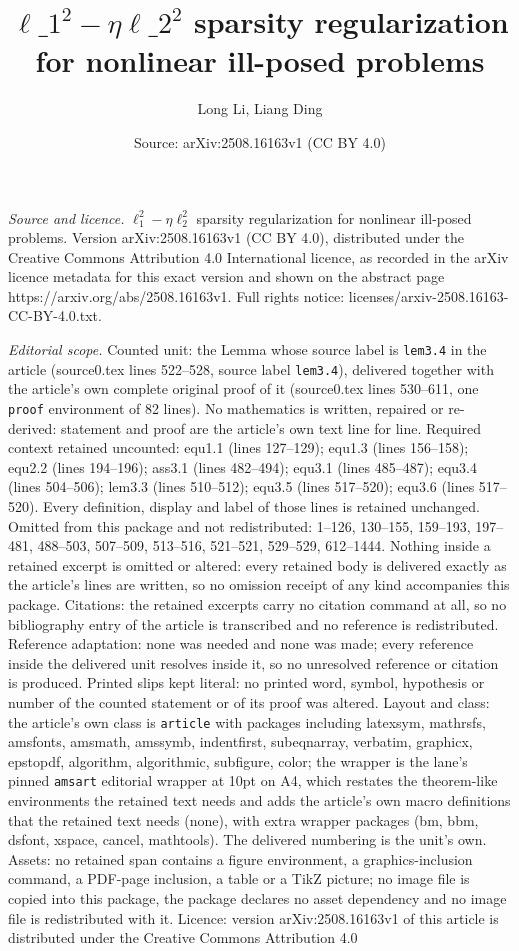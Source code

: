 \documentclass[10pt,a4paper]{amsart}
\title[$\ell\_{1}^{2}-\eta\ell\_{2}^{2}$ sparsity regularization for ]{$\ell\_{1}^{2}-\eta\ell\_{2}^{2}$ sparsity regularization for nonlinear ill-posed problems}
\author{Long Li, Liang Ding}
\date{Source: arXiv:2508.16163v1 (CC BY 4.0)}
\begin{document}
\maketitle

\noindent\emph{Source and licence.} $\ell_{1}^{2}-\eta\ell_{2}^{2}$ sparsity regularization for nonlinear ill-posed problems. Version arXiv:2508.16163v1 (CC BY 4.0), distributed under the Creative Commons Attribution 4.0 International licence, as recorded in the arXiv licence metadata for this exact version and shown on the abstract page https://arxiv.org/abs/2508.16163v1. Full rights notice: licenses/arxiv-2508.16163-CC-BY-4.0.txt.\par\smallskip

\noindent\textit{Editorial scope.} Counted unit: the Lemma whose source label is \texttt{lem3.4} in the article (source0.tex lines 522--528, source label \texttt{lem3.4}), delivered together with the article's own complete original proof of it (source0.tex lines 530--611, one \texttt{proof} environment of 82 lines). No mathematics is written, repaired or re-derived: statement and proof are the article's own text line for line. Required context retained uncounted: equ1.1 (lines 127--129); equ1.3 (lines 156--158); equ2.2 (lines 194--196); ass3.1 (lines 482--494); equ3.1 (lines 485--487); equ3.4 (lines 504--506); lem3.3 (lines 510--512); equ3.5 (lines 517--520); equ3.6 (lines 517--520). Every definition, display and label of those lines is retained unchanged. Omitted from this package and not redistributed: 1--126, 130--155, 159--193, 197--481, 488--503, 507--509, 513--516, 521--521, 529--529, 612--1444. Nothing inside a retained excerpt is omitted or altered: every retained body is delivered exactly as the article's lines are written, so no omission receipt of any kind accompanies this package. Citations: the retained excerpts carry no citation command at all, so no bibliography entry of the article is transcribed and no reference is redistributed. Reference adaptation: none was needed and none was made; every reference inside the delivered unit resolves inside it, so no unresolved reference or citation is produced. Printed slips kept literal: no printed word, symbol, hypothesis or number of the counted statement or of its proof was altered. Layout and class: the article's own class is \texttt{article} with packages including latexsym, mathrsfs, amsfonts, amsmath, amssymb, indentfirst, subeqnarray, verbatim, graphicx, epstopdf, algorithm, algorithmic, subfigure, color; the wrapper is the lane's pinned \texttt{amsart} editorial wrapper at 10pt on A4, which restates the theorem-like environments the retained text needs and adds the article's own macro definitions that the retained text needs (none), with extra wrapper packages (bm, bbm, dsfont, xspace, cancel, mathtools). The delivered numbering is the unit's own. Assets: no retained span contains a figure environment, a graphics-inclusion command, a PDF-page inclusion, a table or a TikZ picture; no image file is copied into this package, the package declares no asset dependency and no image file is redistributed with it. Licence: version arXiv:2508.16163v1 of this article is distributed under the Creative Commons Attribution 4.0 
\end{document}
